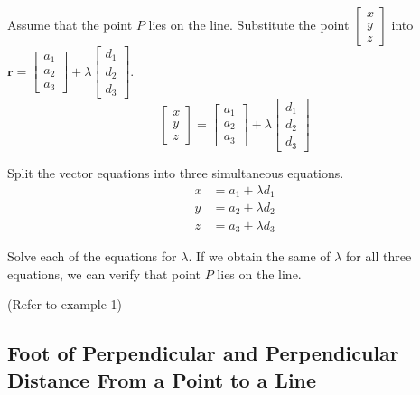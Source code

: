 \documentclass[11pt,a4paper]{book}
\begin{document}
\begin{steps}[leftmargin=2cm]

\item  Assume that the point $P$ lies on the line. Substitute the
point $\begin{bmatrix}x\\
y\\
z
\end{bmatrix}$ into $\textbf{r}=\begin{bmatrix}a_{1}\\
a_{2}\\
a_{3}
\end{bmatrix}+\lambda\begin{bmatrix}d_{1}\\
d_{2}\\
d_{3}
\end{bmatrix}$.
\[
\begin{bmatrix}x\\
y\\
z
\end{bmatrix}=\begin{bmatrix}a_{1}\\
a_{2}\\
a_{3}
\end{bmatrix}+\lambda\begin{bmatrix}d_{1}\\
d_{2}\\
d_{3}
\end{bmatrix}
\]

\item  Split the vector equations into three simultaneous equations.
\begin{align*}
x & =a_{1}+\lambda d_{1}\\
y & =a_{2}+\lambda d_{2}\\
z & =a_{3}+\lambda d_{3}
\end{align*}

\item  Solve each of the equations for $\lambda$. If we obtain the
same of $\lambda$ for all three equations, we can verify that point
$P$ lies on the line.

\end{steps}

(Refer to example 1)

\subsection{Foot of Perpendicular and Perpendicular Distance From a Point to a Line}
\end{document}
